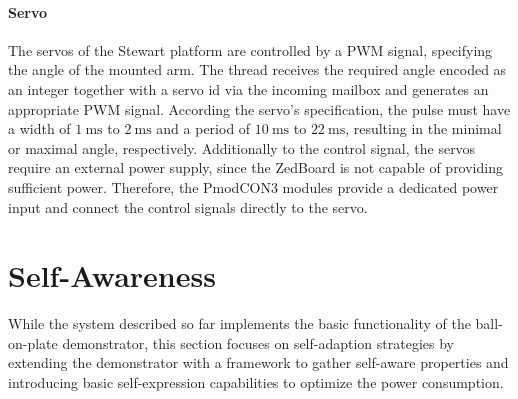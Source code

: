 \paragraph{Servo} The servos of the Stewart platform are controlled by a
\ac{PWM} signal, specifying the angle of the mounted arm. The thread receives
the required angle encoded as an integer together with a servo id via the
incoming mailbox and generates an appropriate \ac{PWM} signal. According the
servo's specification, the pulse must have a width of $\SI{1}{\milli\second}$
to $\SI{2}{\milli\second}$ and a period of $\SI{10}{\milli\second}$ to
$\SI{22}{\milli\second}$, resulting in the minimal or maximal angle,
respectively. Additionally to the control signal, the servos require an
external power supply, since the ZedBoard is not capable of providing
sufficient power. Therefore, the PmodCON3 modules provide a dedicated power
input and connect the control signals directly to the servo.

\section{Self-Awareness}
While the system described so far implements the basic functionality of the
ball-on-plate demonstrator, this section focuses on self-adaption strategies
by extending the demonstrator with a framework to gather self-aware properties
and introducing basic self-expression capabilities to optimize the power
consumption.

